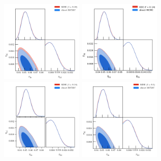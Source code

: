 \documentclass[prd,amsmath,amssymb,floatfix,superscriptaddress,nofootinbib]{revtex4-1}
\begin{document}
\begin{figure}
\includegraphics[width=0.35\textwidth]{cosmomc_kde/pl18_tanh_highz_test5_run1_vs_relike_tanh_highz_test9_run4_f0p18_taulo_prior_0p03_zre_prior_6p1_taulo_prior_0p0_tri_smooth_scale_1D_2_num_bins_1D_20_smooth_scale_2D_2_num_bins_2D_25.png}
%
\includegraphics[width=0.35\textwidth]{cosmomc_kde/pl18_tanh_highz_test5_run1_vs_relike_tanh_highz_test8_run9_f0p14_taulo_prior_0p03_zre_prior_6p1_taulo_prior_0p0_tri.png}
\includegraphics[width=0.35\textwidth]{cosmomc_kde/pl18_tanh_highz_test5_run1_vs_relike_tanh_highz_test8_run9_f0p14_taulo_prior_0p03_zre_prior_6p1_taulo_prior_0p0_tri_smooth_scale_1D_2_num_bins_1D_20_smooth_scale_2D_2_num_bins_2D_25.png}
%
\includegraphics[width=0.35\textwidth]{cosmomc_kde/pl18_tanh_highz_test5_run1_vs_relike_tanh_highz_test9_run3_f0p10_taulo_prior_0p03_zre_prior_6p1_taulo_prior_0p0_tri.png}

\end{figure}
\end{document}
